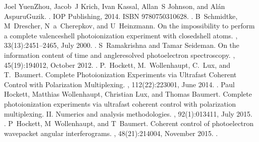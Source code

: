 \documentclass[letterpaper,table,10pt,english]{jupyterBook}
\begin{document}
\begin{sphinxthebibliography}{10}
\sphinxAtStartPar
Joel Yuen\sphinxhyphen{}Zhou, Jacob J Krich, Ivan Kassal, Allan S Johnson, and Alán Aspuru\sphinxhyphen{}Guzik. . IOP Publishing, 2014. ISBN 978\sphinxhyphen{}0\sphinxhyphen{}7503\sphinxhyphen{}1062\sphinxhyphen{}8. .
\sphinxAtStartPar
B Schmidtke, M Drescher, N a Cherepkov, and U Heinzmann. On the impossibility to perform a complete valence\sphinxhyphen{}shell photoionization experiment with closed\sphinxhyphen{}shell atoms. , 33(13):2451–2465, July 2000. .
\sphinxAtStartPar
S Ramakrishna and Tamar Seideman. On the information content of time\sphinxhyphen{} and angle\sphinxhyphen{}resolved photoelectron spectroscopy. , 45(19):194012, October 2012. .
\sphinxAtStartPar
P. Hockett, M. Wollenhaupt, C. Lux, and T. Baumert. Complete Photoionization Experiments via Ultrafast Coherent Control with Polarization Multiplexing. , 112(22):223001, June 2014. .
\sphinxAtStartPar
Paul Hockett, Matthias Wollenhaupt, Christian Lux, and Thomas Baumert. Complete photoionization experiments via ultrafast coherent control with polarization multiplexing. II. Numerics and analysis methodologies. , 92(1):013411, July 2015. .
\sphinxAtStartPar
P Hockett, M Wollenhaupt, and T Baumert. Coherent control of photoelectron wavepacket angular interferograms. , 48(21):214004, November 2015. .
\end{sphinxthebibliography}







\renewcommand{\indexname}{Index}
\printindex
\end{document}
